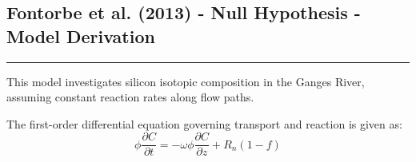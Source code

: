 \begin{tcolorbox}[
    colback=white,
    colframe=white,
    sharp corners,
    boxrule=0pt,
    breakable,
    width=\dimexpr\textwidth+1cm\relax,
    enlarge left by=-0.5cm,
    leftrule=0mm, rightrule=0mm, toprule=0mm, bottomrule=0mm
]




\subsection*{Fontorbe et al. (2013) - Null Hypothesis - Model Derivation}
\vspace{-5mm}
{\footnotesize

\noindent\rule{\textwidth}{0.5pt}

This model investigates silicon isotopic composition in the Ganges River, assuming constant reaction rates along flow paths.

\begin{multicols}{2}

    The first-order differential equation governing transport and reaction is given as:
    \vspace{10mm}
    \columnbreak
    \begin{equation}
    \phi \frac{\partial C}{\partial t} = -\omega \phi \frac{\partial C}{\partial z} + R_n(1-f)
    \end{equation} 
    
\end{multicols}

    
}
\end{tcolorbox}
